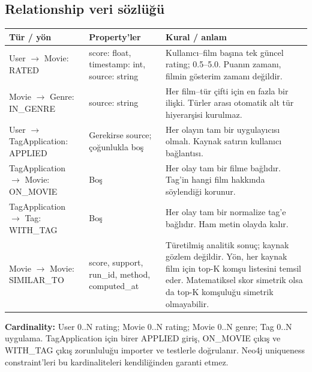 \documentclass[11pt,a4paper]{article}
\begin{document}
\subsection{Relationship veri sözlüğü}
\small
\begin{longtable}{@{}P{38mm}P{48mm}P{64mm}@{}}\toprule
\textbf{Tür / yön} & \textbf{Property'ler} & \textbf{Kural / anlam}\\\midrule\endhead
User $\to$ Movie: RATED & score: float, timestamp: int, source: string & Kullanıcı--film başına tek güncel rating; 0.5--5.0. Puanın zamanı, filmin gösterim zamanı değildir.\\
Movie $\to$ Genre: IN\_GENRE & source: string & Her film--tür çifti için en fazla bir ilişki. Türler arası otomatik alt tür hiyerarşisi kurulmaz.\\
User $\to$ TagApplication: APPLIED & Gerekirse source; çoğunlukla boş & Her olayın tam bir uygulayıcısı olmalı. Kaynak satırın kullanıcı bağlantısı.\\
TagApplication $\to$ Movie: ON\_MOVIE & Boş & Her olay tam bir filme bağlıdır. Tag'in hangi film hakkında söylendiği korunur.\\
TagApplication $\to$ Tag: WITH\_TAG & Boş & Her olay tam bir normalize tag'e bağlıdır. Ham metin olayda kalır.\\
Movie $\to$ Movie: SIMILAR\_TO & score, support, run\_id, method, computed\_at & Türetilmiş analitik sonuç; kaynak gözlem değildir. Yön, her kaynak film için top-K komşu listesini temsil eder. Matematiksel skor simetrik olsa da top-K komşuluğu simetrik olmayabilir.\\\bottomrule
\end{longtable}\normalsize

\textbf{Cardinality:} User 0..N rating; Movie 0..N rating; Movie 0..N genre; Tag 0..N uygulama. TagApplication için birer APPLIED giriş, ON\_MOVIE çıkış ve WITH\_TAG çıkış zorunluluğu importer ve testlerle doğrulanır. Neo4j uniqueness constraint'leri bu kardinaliteleri kendiliğinden garanti etmez.
\end{document}
